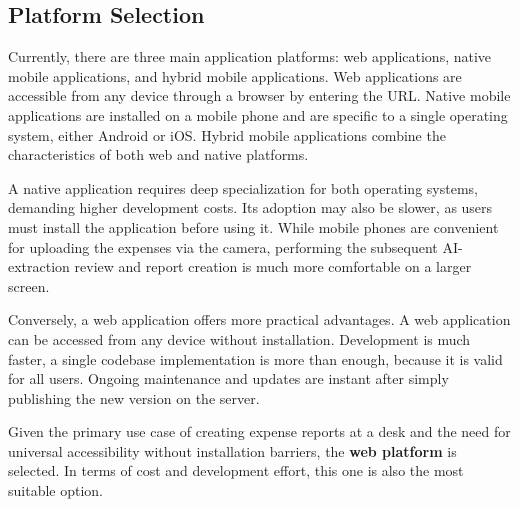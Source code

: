 \subsection{Platform Selection}

Currently, there are three main application platforms: web applications, native mobile applications, and hybrid mobile applications. Web applications are accessible from any device through a browser by entering the URL. Native mobile applications are installed on a mobile phone and are specific to a single operating system, either Android or iOS. Hybrid mobile applications combine the characteristics of both web and native platforms.

A native application requires deep specialization for both operating systems, demanding higher development costs. Its adoption may also be slower, as users must install the application before using it. While mobile phones are convenient for uploading the expenses via the camera, performing the subsequent AI-extraction review and report creation is much more comfortable on a larger screen.

Conversely, a web application offers more practical advantages. A web application can be accessed from any device without installation. Development is much faster, a single codebase implementation is more than enough, because it is valid for all users. Ongoing maintenance and updates are instant after simply publishing the new version on the server. 


Given the primary use case of creating expense reports at a desk and the need for universal accessibility without installation barriers, the \textbf{web platform} is selected. In terms of cost and development effort, this one is also the most suitable option.
